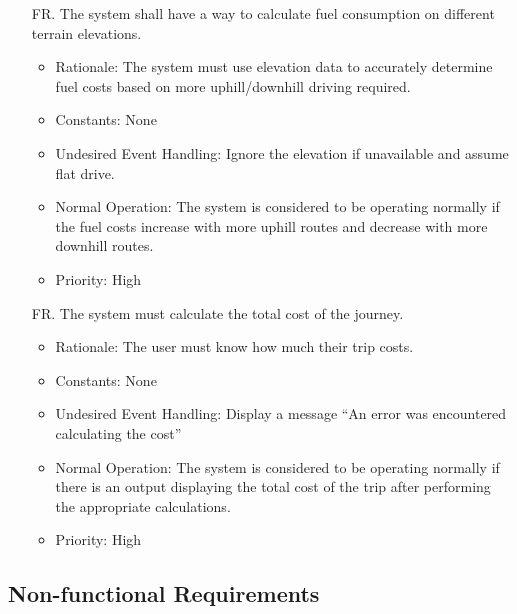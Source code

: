 \documentclass[12pt]{article}
\newcounter{reqnum} %
\begin{document}
\begin{itemize}
\item[FR\refstepcounter{reqnum}\thereqnum. ] The system shall have a way to calculate fuel consumption on different terrain elevations.
\begin{itemize}
    \item Rationale: The system must use elevation data to accurately determine fuel costs based on more uphill/downhill driving required.
    \item Constants: None
    \item Undesired Event Handling: Ignore the elevation if unavailable and assume flat drive.
    \item Normal Operation: The system is considered to be operating normally if the fuel costs increase with more uphill routes and decrease with more downhill routes.
	\item Priority: High
\end{itemize}

\item[FR\refstepcounter{reqnum}\thereqnum. ] The system must calculate the total cost of the journey.
\begin{itemize}
    \item Rationale: The user must know how much their trip costs.
    \item Constants: None
    \item Undesired Event Handling: Display a message “An error was encountered calculating the cost”
    \item Normal Operation: The system is considered to be operating normally if there is an output displaying the total cost of the trip after performing the appropriate calculations.
	\item Priority: High
\end{itemize}

\end{itemize}

\subsection{Non-functional Requirements}
\end{document}
